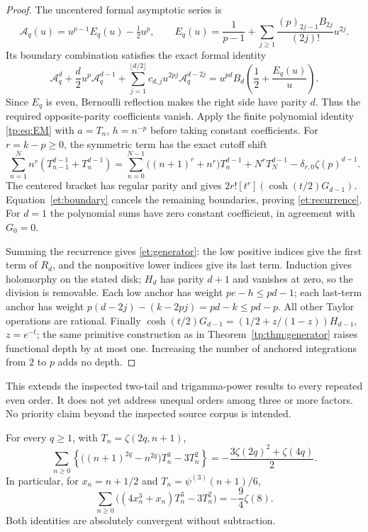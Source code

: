 \begin{proof}
The uncentered formal asymptotic series is
\[
 \mathcal A_q(u)=u^{p-1}E_q(u)-\tfrac12u^p,
 \qquad E_q(u)=\frac1{p-1}
    +\sum_{j\geq1}\frac{(p)_{2j-1}B_{2j}}{(2j)!}u^{2j}.
\]
Its boundary combination satisfies the exact formal identity
\begin{equation}\label{et:boundary}
 \mathcal A_q^d+\frac d2u^p\mathcal A_q^{d-1}
 +\sum_{j=1}^{\lfloor d/2\rfloor}c_{d,j}u^{2pj}\mathcal A_q^{d-2j}
 =u^{pd}B_d\left(\frac12+\frac{E_q(u)}u\right).
\end{equation}
Since $E_q$ is even, Bernoulli reflection makes the right side have
parity $d$. Thus the required opposite-parity coefficients vanish.
Apply the finite polynomial identity \eqref{tp:eq:EM} with
$a=T_n$, $h=n^{-p}$ before taking constant coefficients. For
$r=k-p\geq0$, the symmetric term has the exact cutoff shift
\[
 \sum_{n=1}^N n^r(T_{n-1}^{d-1}+T_n^{d-1})
 =\sum_{n=0}^{N-1}\bigl((n+1)^r+n^r\bigr)T_n^{d-1}
   +N^rT_N^{d-1}-\delta_{r,0}\zeta(p)^{d-1}.
\]
The centered bracket has regular parity and gives
$2r![t^r](\cosh(t/2)G_{d-1})$. Equation~\eqref{et:boundary}
cancels the remaining boundaries, proving \eqref{et:recurrence}.
For $d=1$ the polynomial sums have zero constant coefficient, in
agreement with $G_0=0$.

Summing the recurrence gives \eqref{et:generator}: the low positive
indices give the first term of $R_d$, and the nonpositive lower
indices give its last term. Induction gives holomorphy on the stated
disk; $H_d$ has parity $d+1$ and vanishes at zero, so the division is
removable. Each low anchor has weight $pe-h\leq pd-1$; each last-term
anchor has weight $p(d-2j)-(k-2pj)=pd-k\leq pd-p$.
All other Taylor operations are rational. Finally
$\cosh(t/2)G_{d-1}=(1/2+z/(1-z))H_{d-1}$, $z=e^{-t}$;
the same primitive construction as in Theorem~\ref{tp:thm:generator}
raises functional depth by at most one. Increasing the number of
anchored integrations from $2$ to $p$ adds no depth.
\end{proof}

This extends the inspected two-tail and trigamma-power results to every
repeated even order. It does not yet address unequal orders among
three or more factors. No priority claim beyond the inspected source
corpus is intended.

\begin{corollary}
\label{et:cubic}
For every $q\geq1$, with $T_n=\zeta(2q,n+1)$,
\begin{equation}\label{et:cubic-formula}
 \boxed{\sum_{n\geq0}\left\{
       \bigl((n+1)^{2q}-n^{2q}\bigr)T_n^3-3T_n^2\right\}
       =-\frac{3\zeta(2q)^2+\zeta(4q)}2.}
\end{equation}
In particular, for $x_n=n+1/2$ and $T_n=\psi^{(3)}(n+1)/6$,
\begin{equation}\label{et:psi3}
 \boxed{\sum_{n\geq0}
       \bigl((4x_n^3+x_n)T_n^3-3T_n^2\bigr)
                      =-\frac94\zeta(8).}
\end{equation}
Both identities are absolutely convergent without subtraction.
\end{corollary}

